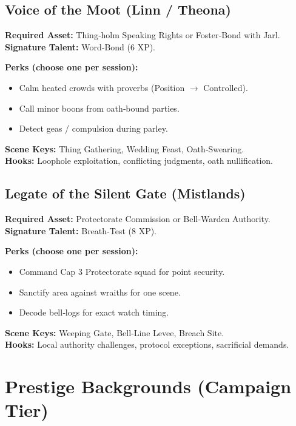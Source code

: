 \subsection{Voice of the Moot (Linn / Theona)}\label{subsec:voice_moot}

\textbf{Required Asset:} Thing‑holm Speaking Rights or Foster‑Bond with Jarl.\\
\textbf{Signature Talent:} Word‑Bond (6 XP).

\textbf{Perks (choose one per session):}
\begin{itemize}
    \item Calm heated crowds with proverbs (Position $\rightarrow$ Controlled).
    \item Call minor boons from oath‑bound parties.
    \item Detect geas / compulsion during parley.
\end{itemize}

\textbf{Scene Keys:} Thing Gathering, Wedding Feast, Oath‑Swearing.\\
\textbf{Hooks:} Loophole exploitation, conflicting judgments, oath nullification.

\subsection{Legate of the Silent Gate (Mistlands)}\label{subsec:legate_gate}

\textbf{Required Asset:} Protectorate Commission or Bell‑Warden Authority.\\
\textbf{Signature Talent:} Breath‑Test (8 XP).

\textbf{Perks (choose one per session):}
\begin{itemize}
    \item Command Cap 3 Protectorate squad for point security.
    \item Sanctify area against wraiths for one scene.
    \item Decode bell‑logs for exact watch timing.
\end{itemize}

\textbf{Scene Keys:} Weeping Gate, Bell‑Line Levee, Breach Site.\\
\textbf{Hooks:} Local authority challenges, protocol exceptions, sacrificial demands.

\section{Prestige Backgrounds (Campaign Tier)}\label{sec:prestige_backgrounds}

